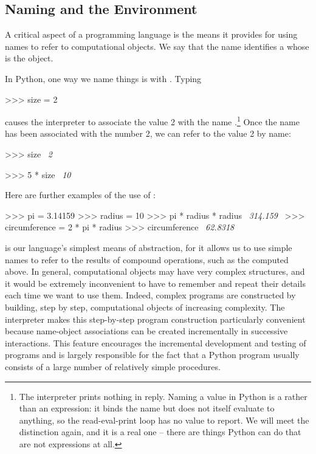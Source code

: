 \subsection{Naming and the Environment}
\label{Section 1.1.2}

A critical aspect of a programming language is the means it provides for using
names to refer to computational objects.  We say that the name identifies a
 whose  is the object.

In Python, one way we name things is with \code{=}.  Typing

\begin{codeBlock}
>>> size = 2
\end{codeBlock}

\noindent
causes the interpreter to associate the value 2 with the name
.\footnote{The interpreter prints nothing in reply. Naming a value
in Python is a  rather than an expression: it binds the name
but does not itself evaluate to anything, so the read-eval-print loop has no
value to report. We will meet the distinction again, and it is a real one --
there are things Python can do that are not expressions at all.} Once
the name  has been associated with the number 2, we can refer to the
value 2 by name:

\begin{codeBlock}
>>> size
~\textit{2}~
\end{codeBlock}

\begin{codeBlock}
>>> 5 * size
~\textit{10}~
\end{codeBlock}

\noindent
Here are further examples of the use of \code{=}:

\begin{codeBlock}
>>> pi = 3.14159
>>> radius = 10
>>> pi * radius * radius
~\textit{314.159}~
>>> circumference = 2 * pi * radius
>>> circumference
~\textit{62.8318}~
\end{codeBlock}

\noindent
\code{=} is our language's simplest means of abstraction, for it allows us
to use simple names to refer to the results of compound operations, such as the
 computed above.  In general, computational objects may
have very complex structures, and it would be extremely inconvenient to have to
remember and repeat their details each time we want to use them.  Indeed,
complex programs are constructed by building, step by step, computational
objects of increasing complexity. The interpreter makes this step-by-step
program construction particularly convenient because name-object associations
can be created incrementally in successive interactions.  This feature
encourages the incremental development and testing of programs and is largely
responsible for the fact that a Python program usually consists of a large
number of relatively simple procedures.

